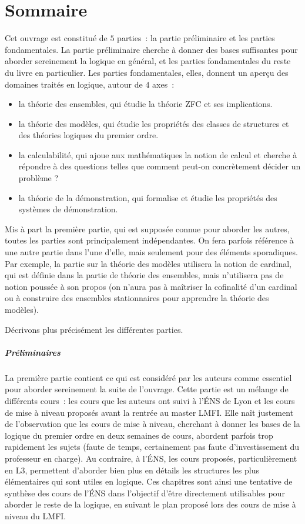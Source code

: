 \chapter[Sommaire]{Sommaire}

Cet ouvrage est constitué de $5$ parties~: la partie préliminaire et les parties
fondamentales. La partie préliminaire cherche à donner des bases suffisantes
pour aborder sereinement la logique en général, et les parties fondamentales du
reste du livre en particulier. Les parties fondamentales, elles, donnent un
aperçu des domaines traités en logique, autour de $4$ axes~:
\begin{itemize}
\item la théorie des ensembles, qui étudie la théorie ZFC et ses implications.
\item la théorie des modèles, qui étudie les propriétés des classes de
  structures et des théories logiques du premier ordre.
\item la calculabilité, qui ajoue aux mathématiques la notion de calcul et
  cherche à répondre à des questions telles que \og comment peut-on concrètement
  décider un problème ?\fg
\item la théorie de la démonstration, qui formalise et étudie les propriétés des
  systèmes de démonstration.
\end{itemize}

Mis à part la première partie, qui est supposée connue pour aborder les autres,
toutes les parties sont principalement indépendantes. On fera parfois référence
à une autre partie dans l'une d'elle, mais seulement pour des éléments
sporadiques. Par exemple, la partie sur la théorie des modèles utilisera la
notion de cardinal, qui est définie dans la partie de théorie des ensembles,
mais n'utilisera pas de notion poussée à son propos (on n'aura pas à maîtriser
la cofinalité d'un cardinal ou à construire des ensembles stationnaires pour
apprendre la théorie des modèles).

Décrivons plus précisément les différentes parties.

\paragraph{Préliminaires}
La première partie contient ce qui est considéré par les auteurs comme essentiel
pour aborder sereinement la suite de l'ouvrage. Cette partie est un mélange de
différents cours~: les cours que les auteurs ont suivi à l'\'ENS de Lyon et les
cours de mise à niveau proposés avant la rentrée au master LMFI. Elle naît
justement de l'observation que les cours de mise à niveau, cherchant à donner
les bases de la logique du premier ordre en deux semaines de cours, abordent
parfois trop rapidement les sujets (faute de temps, certainement pas faute
d'investissement du professeur en charge). Au contraire, à l'\'ENS, les cours
proposés, particulièrement en L3, permettent d'aborder bien plus en détails les
structures les plus élémentaires qui sont utiles en logique. Ces chapitres sont
ainsi une tentative de synthèse des cours de l'\'ENS dans l'objectif d'être
directement utilisables pour aborder le reste de la logique, en suivant le
plan proposé lors des cours de mise à niveau du LMFI.

